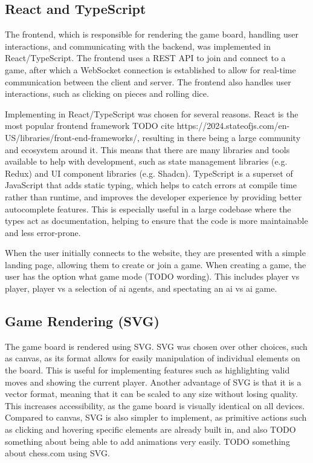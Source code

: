 \subsection{React and TypeScript}
The frontend, which is responsible for rendering the game board, handling user interactions, and communicating with the backend, was implemented in React/TypeScript. The frontend uses a REST API to join and connect to a game, after which a WebSocket connection is established to allow for real-time communication between the client and server. The frontend also handles user interactions, such as clicking on pieces and rolling dice.

Implementing in React/TypeScript was chosen for several reasons. React is the most popular frontend framework TODO cite https://2024.stateofjs.com/en-US/libraries/front-end-frameworks/, resulting in there being a large community and ecosystem around it. 
This means that there are many libraries and tools available to help with development, such as state management libraries (e.g. Redux) and UI component libraries (e.g. Shadcn). 
TypeScript is a superset of JavaScript that adds static typing, which helps to catch errors at compile time rather than runtime, and improves the developer experience by providing better autocomplete features. 
This is especially useful in a large codebase where the types act as documentation, helping to ensure that the code is more maintainable and less error-prone.


When the user initially connects to the website, they are presented with a simple landing page, allowing them to create or join a game. When creating a game, the user has the option what game mode (TODO wording). This includes player vs player, player vs a selection of ai agents, and spectating an ai vs ai game. 
\subsection{Game Rendering (SVG)}
The game board is rendered using SVG. SVG was chosen over other choices, such as canvas, as its format allows for easily manipulation of individual elements on the board. This is useful for implementing features such as highlighting valid moves and showing the current player.
Another advantage of SVG is that it is a vector format, meaning that it can be scaled to any size without losing quality. This increases accessibility, as the game board is visually identical on all devices. 
Compared to canvas, SVG is also simpler to implement, as primitive actions such as clicking and hovering specific elements are already built in, and also TODO something about being able to add animations very easily. TODO something about chess.com using SVG.
